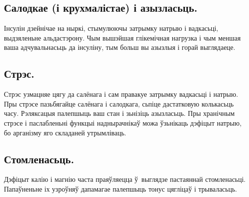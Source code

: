 \subsection{Салодкае (і крухмалістае) і азызласьць.}
Інсулін дзейнічае на ныркі, стымулюючы затрымку натрыю і вадкасьці, выдзяленьне альдастэрону. Чым вышэйшая глікемічная нагрузка і чым меншая ваша адчувальнасьць да інсуліну, тым больш вы азызлыя і горай выглядаеце.

\subsection{Стрэс.}
Стрэс узмацняе цягу да салёнага і сам правакуе затрымку вадкасьці і натрыю. Пры стрэсе пазьбягайце салёнага і салодкага, сьпіце дастатковую колькасьць часу. Рэляксацыя палепшыць ваш стан і зьнізіць азызласьць. Пры хранічным стрэсе і паслабленьні функцыі наднырачнікаў можа ўзьнікаць дэфіцыт натрыю, бо арганізму яго складаней утрымліваць.

\subsection{Стомленасьць.}
Дэфіцыт калію і магнію часта праяўляецца ў~выглядзе пастаяннай стомленасьці. Папаўненьне іх узроўняў дапамагае палепшыць тонус цягліцаў і трываласьць.
